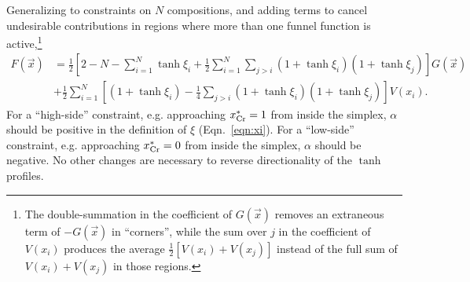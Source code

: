 \documentclass[10pt]{article}
\begin{document}
			Generalizing to constraints on $N$ compositions, and adding terms to cancel undesirable contributions in regions where more than one funnel function is active,\footnote{
			The double-summation in the coefficient of $G(\vec{x})$ removes an extraneous term of $-G(\vec{x})$ in ``corners'',
			while the sum over $j$ in the coefficient of $V(x_i)$ produces the average $\frac{1}{2}[V(x_i)+V(x_j)]$ instead of the full sum of $V(x_i)+V(x_j)$ in those regions.}
			\begin{align}\nonumber
				F(\vec{x}) &= \frac{1}{2}\left[2-N-\sum\limits_{i=1}^N\tanh\xi_i + \frac{1}{2}\sum\limits_{i=1}^N\sum\limits_{j>i}\left(1+\tanh\xi_i\right)\left(1+\tanh\xi_j\right)\right]G(\vec{x})\\
				           &+ \frac{1}{2}\sum\limits_{i=1}^N\left[\left(1 + \tanh\xi_i\right) - \frac{1}{4}\sum\limits_{j>i}\left(1+\tanh\xi_i\right)\left(1+\tanh\xi_j\right)\right]V(x_i).
			\end{align}
			For a ``high-side'' constraint, e.g. approaching $x^*_{\ce{Cr}}=1$ from inside the simplex, $\alpha$ should be positive in the definition of $\xi$ (Eqn.~\ref{eqn:xi}).
			For a ``low-side'' constraint, e.g. approaching $x^*_{\ce{Cr}}=0$ from inside the simplex, $\alpha$ should be negative.
			No other changes are necessary to reverse directionality of the $\tanh$ profiles.
			
\end{document}

